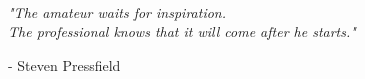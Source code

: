 
\noindent \emph{\\"The amateur waits for inspiration. \\
	The professional knows that it will come after he starts."}
\begin{flushright}
	- Steven Pressfield
\end{flushright}





